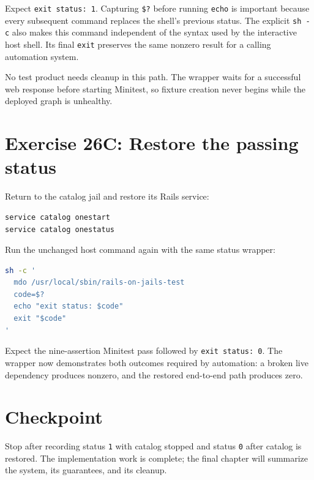 Expect \texttt{exit status: 1}. Capturing \texttt{\$?} before running
\texttt{echo} is important because every subsequent command replaces the
shell's previous status. The explicit \texttt{sh -c} also makes this command
independent of the syntax used by the interactive host shell. Its final
\texttt{exit} preserves the same nonzero result for a calling automation
system.

No test product needs cleanup in this path. The wrapper waits for a successful
web response before starting Minitest, so fixture creation never begins while
the deployed graph is unhealthy.

\section{Exercise 26C: Restore the passing status}

Return to the catalog jail and restore its Rails service:

\begin{lstlisting}[language=sh]
service catalog onestart
service catalog onestatus
\end{lstlisting}

Run the unchanged host command again with the same status wrapper:

\begin{lstlisting}[language=sh]
sh -c '
  mdo /usr/local/sbin/rails-on-jails-test
  code=$?
  echo "exit status: $code"
  exit "$code"
'
\end{lstlisting}

Expect the nine-assertion Minitest pass followed by \texttt{exit status: 0}.
The wrapper now demonstrates both outcomes required by automation: a broken
live dependency produces nonzero, and the restored end-to-end path produces
zero.

\section{Checkpoint}

Stop after recording status \texttt{1} with catalog stopped and status
\texttt{0} after catalog is restored. The implementation work is complete;
the final chapter will summarize the system, its guarantees, and its cleanup.
